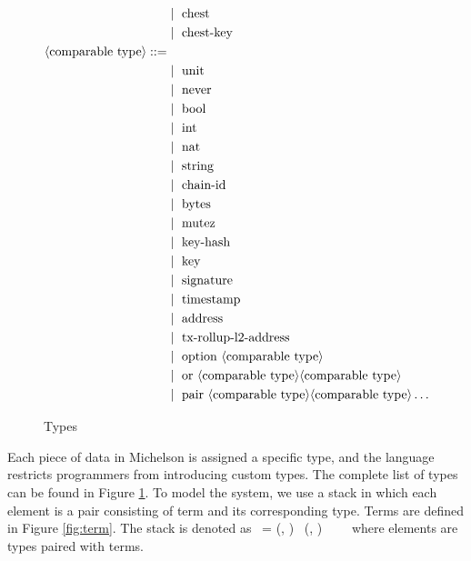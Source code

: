 \documentclass[a4paper,USenglish,cleveref, autoref, thm-restate]{lipics-v2021}
\begin{document}
\begin{figure} []
\begin{align*}
   &\mid\ \text{chest} \\
   &\mid\ \text{chest-key} \\
\langle\text{comparable type}\rangle ::= \\
   &\mid\ \text{unit} \\
   &\mid\ \text{never} \\
   &\mid\ \text{bool} \\
   &\mid\ \text{int}\\
   &\mid\ \text{nat}\\
   &\mid\ \text{string}\\
   &\mid\ \text{chain-id}\\
   &\mid\ \text{bytes}\\
   &\mid\ \text{mutez}\\
   &\mid\ \text{key-hash}\\
   &\mid\ \text{key}\\
   &\mid\ \text{signature}\\
   &\mid\ \text{timestamp}\\
   &\mid\ \text{address}\\
   &\mid\ \text{tx-rollup-l2-address}\\
   &\mid\ \text{option}\ \langle\text{comparable type}\rangle\\
   &\mid\ \text{or}\ \langle\text{comparable type}\rangle \langle\text{comparable type}\rangle\\
   &\mid\ \text{pair}\ \langle\text{comparable type}\rangle \langle\text{comparable type}\rangle \dots \\
\end{align*}
\caption{Types}
\label{fig:type}
\end{figure}
Each piece of data in Michelson is assigned a specific type, and the language restricts programmers from introducing custom types. The complete list of types can be found in Figure \ref{fig:type}. To model the system, we use a stack in which each element is a pair consisting of term and its corresponding type. Terms are defined in Figure \ref{fig:term}. The stack is denoted as \STACK\ = (\TermOne, \TYF) \STACKCONCAT\ (\TermTwo, \TYS) \STACKCONCAT\ \DOT\ \STACKCONCAT\ \EMPTYSTACK\ where elements are types paired with terms. 
\end{document}

